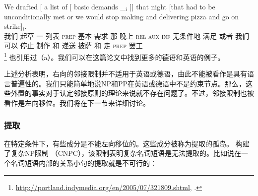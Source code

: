 \ex 
\gll We drafted [ a list of [ basic demands \_$_i$ ]] that night [that had to be unconditionally met or we would stop making and delivering pizza and go on strike]$_i$.\\
我们 起草 {} 一 列表 \textsc{prep} {} 基本 需求  {} {} 那 晚上 \spacebr\textsc{rel} \textsc{aux} \textsc{inf} \passive{} 无条件地 满足 或者 我们 可以 停止 制作 和 递送 披萨 和 走 \textsc{prep} 罢工\\
\footnote{%
\url{http://portland.indymedia.org/en/2005/07/321809.shtml}, .
}
\zl
 也引用过（a）。我们可以在这篇论文中找到更多的德语和英语的例子。

上述分析表明，右向的邻接限制并不适用于英语或德语，由此不能被看作是具有语言普遍性的。我们只能简单地说NP和PP在英语或德语中不是约束节点。那么，这些外置的事实对于认定邻接原则的理论来说就不存在问题了。不过，邻接限制也被看作是左向移位。我们将在下一节来详细讨论。 

\subsubsection{提取}
\label{Abschnitt-Subjazenz-Extraktion}

在特定条件下，有些成分是不能左向移位的\citep{Ross67}。这些成分被称为提取的孤岛。 \citet[\S~4.1]{Ross67}构建了复杂NP限制 （CNPC），该限制表明复杂名词短语是无法提取的。比如说在一个名词短语内部的关系小句的提取就是不可行的： 

